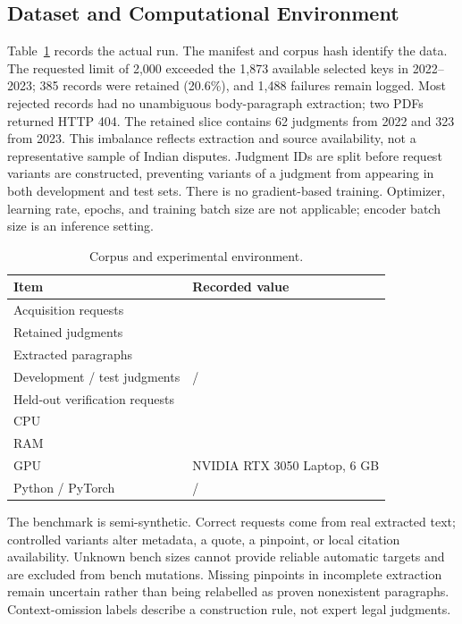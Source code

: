 \documentclass[conference]{IEEEtran}
\begin{document}
\subsection{Dataset and Computational Environment}
Table~\ref{tab:data} records the actual run. The manifest and corpus hash identify the data. The requested limit of 2,000 exceeded the 1,873 available selected keys in 2022--2023; 385 records were retained (20.6\%), and 1,488 failures remain logged. Most rejected records had no unambiguous body-paragraph extraction; two PDFs returned HTTP 404. The retained slice contains 62 judgments from 2022 and 323 from 2023. This imbalance reflects extraction and source availability, not a representative sample of Indian disputes. Judgment IDs are split before request variants are constructed, preventing variants of a judgment from appearing in both development and test sets. There is no gradient-based training. Optimizer, learning rate, epochs, and training batch size are not applicable; encoder batch size is an inference setting.

\begin{table}[t]\centering\caption{Corpus and experimental environment.}\label{tab:data}
\small\begin{tabular}{>{\raggedright\arraybackslash}p{}>{\raggedright\arraybackslash}p{}}\toprule
Item & Recorded value\\\midrule
Acquisition requests & \RequestedCount{}\\
Retained judgments & \CorpusCount{}\\
Extracted paragraphs & \ParagraphCount{}\\
Development / test judgments & \DevJudgments{} / \TestJudgments{}\\
Held-out verification requests & \TestCount{}\\
CPU & \CpuName{}\\
RAM & \RamSize{}\\
GPU & NVIDIA RTX 3050 Laptop, 6 GB\\
Python / PyTorch & \PythonVersion{} / \TorchVersion{}\\\bottomrule
\end{tabular}\end{table}

The benchmark is semi-synthetic. Correct requests come from real extracted text; controlled variants alter metadata, a quote, a pinpoint, or local citation availability. Unknown bench sizes cannot provide reliable automatic targets and are excluded from bench mutations. Missing pinpoints in incomplete extraction remain uncertain rather than being relabelled as proven nonexistent paragraphs. Context-omission labels describe a construction rule, not expert legal judgments.
\end{document}
